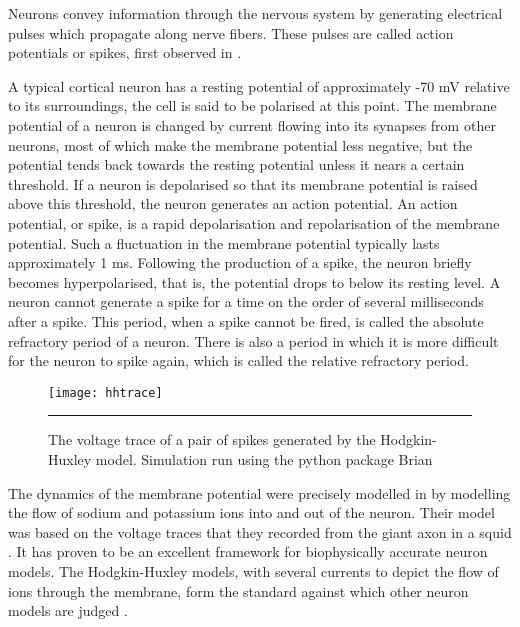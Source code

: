 Neurons convey information through the nervous system by generating
electrical pulses which propagate along nerve fibers.  These pulses are
called action potentials or spikes, first observed in \citep{DuBoisReymond1884a}.  

A typical cortical neuron has a resting potential of approximately -70 mV relative to
its surroundings, the cell is said to be polarised at this point.
The membrane potential of a neuron is changed by current
flowing into its synapses from other neurons, most of which make the membrane potential less negative, but the potential tends back towards the resting potential
unless it nears a certain threshold. If a neuron
is depolarised so that its membrane potential is raised above this
threshold, the neuron generates an action potential. An action potential, or 
spike, is a rapid depolarisation and repolarisation of the membrane potential.  Such a fluctuation in the membrane potential typically lasts 
approximately 1 ms. Following the production of a spike, the neuron briefly 
becomes hyperpolarised, that is, the potential drops to below its resting level. A neuron cannot generate a spike for a
time on the order of several milliseconds after a spike. This period, when a spike cannot be fired, is
called the absolute refractory period of a neuron.  There is also a period in which
it is more difficult for the neuron to spike again, which is called
the relative refractory period. 

\begin{figure}[htb]
\texttt{[image: hhtrace]}
\bigskip
\rule{35em}{0.5pt}
\caption{The voltage trace of a pair of spikes generated by the Hodgkin-Huxley model.  Simulation run using the python package Brian \citep{GoodmanBrette2008a}}
\end{figure}

The dynamics of the membrane potential were precisely modelled in \citep{HodgkinHuxley1952a} by modelling the flow of sodium and potassium ions into and out of the neuron.  Their model was based on the voltage traces that they recorded from the giant axon in a squid \citep{HodgkinHuxley1939a}. It has proven to be an excellent framework for biophysically accurate neuron models. The Hodgkin-Huxley models, with several currents to depict the flow of ions through the membrane, form the standard against which other neuron models are judged \citep{Izhikevich2004a}.

